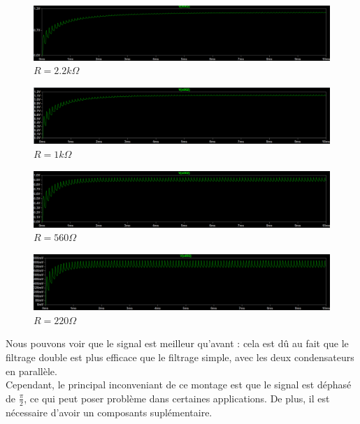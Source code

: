 \begin{figure}[H]
    \begin{center}
    \includegraphics[scale=0.25]{images/LTSPICE/d.png}
    \caption{$R=2.2k\Omega$}
    \end{center}
\end{figure}

\begin{figure}[H]
    \begin{center}
    \includegraphics[scale=0.25]{images/LTSPICE/e.png}
    \caption{$R=1k\Omega$}
    \end{center}
\end{figure}

\begin{figure}[H]
    \begin{center}
    \includegraphics[scale=0.25]{images/LTSPICE/f.png}
    \caption{$R=560\Omega$}
    \end{center}
\end{figure}

\begin{figure}[H]
    \begin{center}
    \includegraphics[scale=0.25]{images/LTSPICE/g.png}
    \caption{$R=220\Omega$}
    \end{center}
\end{figure}

Nous pouvons voir que le signal est meilleur qu'avant : cela est dû au fait que le filtrage double est plus efficace que le filtrage simple, avec les deux condensateurs en parallèle.
\\
Cependant, le principal inconveniant de ce montage est que le signal est déphasé de $\frac{\pi}{2}$, ce qui peut poser problème dans certaines applications. De plus, il est nécessaire d'avoir un composants suplémentaire.